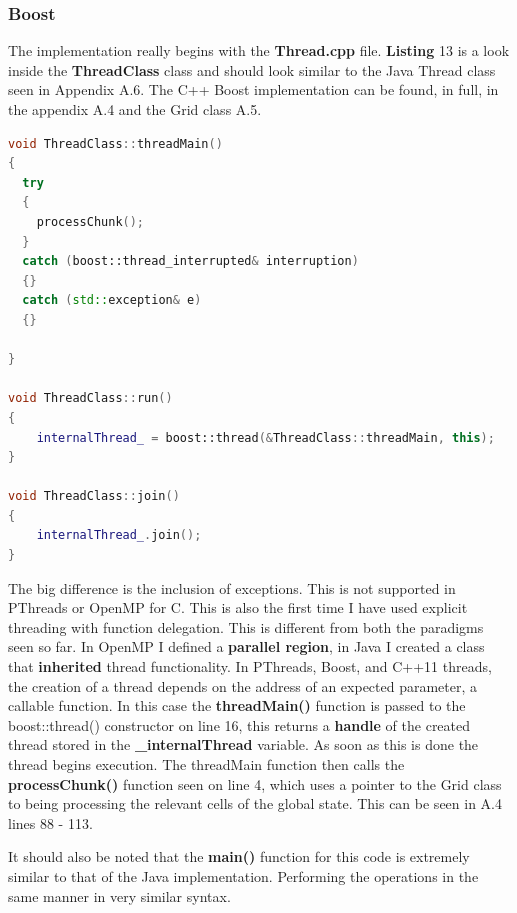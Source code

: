 \documentclass[11pt]{article} %
\begin{document}
\subsubsection{Boost}
The implementation really begins with the {\bf Thread.cpp} file. {\bf Listing} 13 is a look inside the {\bf ThreadClass} class and should look similar to the Java Thread class seen in Appendix A.6. The C++ Boost implementation can be found, in full, in the appendix A.4 and the Grid class A.5.
\begin{lstlisting}[language=c++, caption={Boost implementation Thread class methods}]
void ThreadClass::threadMain()
{
  try
  {
    processChunk();
  }
  catch (boost::thread_interrupted& interruption)
  {}
  catch (std::exception& e)
  {}

}

void ThreadClass::run()
{
	internalThread_ = boost::thread(&ThreadClass::threadMain, this);
}

void ThreadClass::join()
{
    internalThread_.join();
}
\end{lstlisting}
The big difference is the inclusion of exceptions. This is not supported in PThreads or OpenMP for C. This is also the first time I have used explicit threading with function delegation. This is different from both the paradigms seen so far. In OpenMP I defined a {\bf parallel region}, in Java I created a class that {\bf inherited} thread functionality. In PThreads, Boost, and C++11 threads, the creation of a thread depends on the address of an expected parameter, a callable function. In this case the {\bf threadMain()} function is passed to the boost::thread() constructor on line 16, this returns a {\bf handle} of the created thread stored in the {\bf \_internalThread} variable. As soon as this is done the thread begins execution. The threadMain function then calls the {\bf processChunk()} function seen on line 4, which uses a pointer to the Grid class to being processing the relevant cells of the global state. This can be seen in A.4 lines 88 - 113.

It should also be noted that the {\bf main()} function for this code is extremely similar to that of the Java implementation. Performing the operations in the same manner in very similar syntax. 
\end{document}

